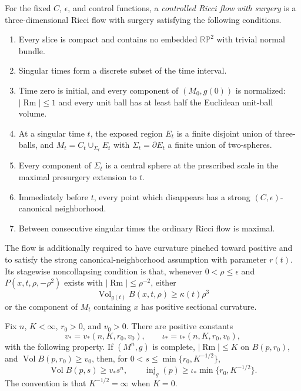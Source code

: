 \begin{definition}
\label{def:controlled-ricci-flow-with-surgery}
\notready
For the fixed $C$, $\epsilon$, and control functions, a
\emph{controlled Ricci flow with surgery} is a three-dimensional Ricci flow
with surgery satisfying the following conditions.
\begin{enumerate}
\item Every slice is compact and contains no embedded $\mathbb{RP}^2$ with
      trivial normal bundle.
\item Singular times form a discrete subset of the time interval.
\item Time zero is initial, and every component of $(M_0,g(0))$ is
      normalized: $|\operatorname{Rm}|\le1$ and every unit ball has at least
      half the Euclidean unit-ball volume.
\item At a singular time $t$, the exposed region $E_t$ is a finite disjoint
      union of three-balls, and
      $M_t=C_t\cup_{\Sigma_t}E_t$ with $\Sigma_t=\partial E_t$ a finite
      union of two-spheres.
\item Every component of $\Sigma_t$ is a central sphere at the prescribed
      scale in the maximal presurgery extension to $t$.
\item Immediately before $t$, every point which disappears has a strong
      $(C,\epsilon)$-canonical neighborhood.
\item Between consecutive singular times the ordinary Ricci flow is maximal.
\end{enumerate}
The flow is additionally required to have curvature pinched toward positive
and to satisfy the strong canonical-neighborhood assumption with parameter
$r(t)$.  Its stagewise noncollapsing condition is that, whenever
$0<\rho\le\epsilon$ and
$P(x,t,\rho,-\rho^2)$ exists with
$|\operatorname{Rm}|\le\rho^{-2}$, either
\[
 \operatorname{Vol}_{g(t)}B(x,t,\rho)\ge\kappa(t)\rho^3
\]
or the component of $M_t$ containing $x$ has positive sectional curvature.
\end{definition}

\begin{theorem}
\label{thm:local-volume-injectivity-radius-control}
\notready
Fix $n$, $K<\infty$, $r_0>0$, and $v_0>0$.  There are positive constants
\[
 v_*=v_*(n,K,r_0,v_0),
 \qquad \iota_*=\iota_*(n,K,r_0,v_0),
\]
with the following property.  If $(M^n,g)$ is complete,
$|\operatorname{Rm}|\le K$ on $B(p,r_0)$, and
$\operatorname{Vol}B(p,r_0)\ge v_0$, then, for
$0<s\le\min\{r_0,K^{-1/2}\}$,
\[
 \operatorname{Vol}B(p,s)\ge v_*s^n,
 \qquad
 \operatorname{inj}_g(p)\ge
 \iota_*\min\{r_0,K^{-1/2}\}.
\]
The convention is that $K^{-1/2}=\infty$ when $K=0$.
\end{theorem}

